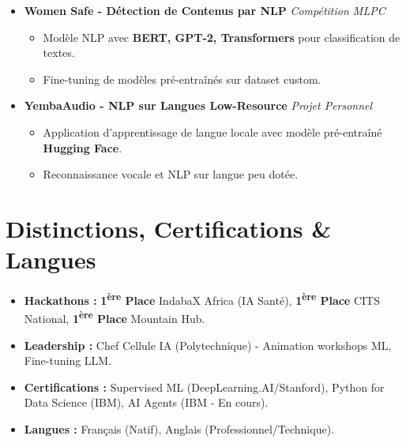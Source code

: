 \documentclass[a4paper,11pt]{article}
\begin{document}
\begin{itemize}[leftmargin=*, label={}]
\item \textbf{Women Safe - Détection de Contenus par NLP} \hfill \textit{Compétition MLPC}
\vspace{-2pt}
    \begin{itemize}[leftmargin=0.4cm, nosep, label=\tiny$\bullet$]
        \item \small{Modèle NLP avec \textbf{BERT, GPT-2, Transformers} pour classification de textes.}
        \item \small{Fine-tuning de modèles pré-entraînés sur dataset custom.}
    \end{itemize}
    \vspace{3pt}

\item \textbf{YembaAudio - NLP sur Langues Low-Resource} \hfill \textit{Projet Personnel}
\vspace{-2pt}
    \begin{itemize}[leftmargin=0.4cm, nosep, label=\tiny$\bullet$]
        \item \small{Application d'apprentissage de langue locale avec modèle pré-entraîné \textbf{Hugging Face}.}
        \item \small{Reconnaissance vocale et NLP sur langue peu dotée.}
    \end{itemize}

\end{itemize}

\section{Distinctions, Certifications \& Langues}
\begin{itemize}[leftmargin=*, nosep]
    \item \textbf{Hackathons :} \textbf{1\textsuperscript{ère} Place} IndabaX Africa (IA Santé), \textbf{1\textsuperscript{ère} Place} CITS National, \textbf{1\textsuperscript{ère} Place} Mountain Hub.
    \item \textbf{Leadership :} Chef Cellule IA (Polytechnique) - Animation workshops ML, Fine-tuning LLM.
    \item \textbf{Certifications :} Supervised ML (DeepLearning.AI/Stanford), Python for Data Science (IBM), AI Agents (IBM - En cours).
    \item \textbf{Langues :} Français (Natif), Anglais (Professionnel/Technique).
\end{itemize}
\end{document}
